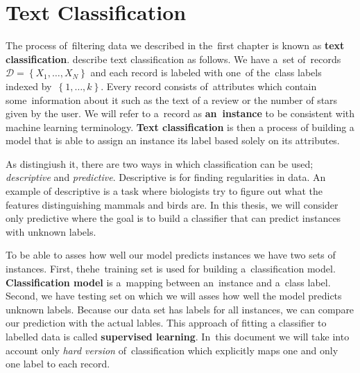 \chapter{Text Classification}


The process of~filtering data we described in the~first chapter is known as {\bf text classification}.
\citet{AggZhai12} describe text classification as follows.
We have a~set of~records~$\mathcal{D} = \left\{X_1, \ldots, X_N\right\}$ and each record is labeled with one~of the~class labels indexed by~$\left\{1,\ldots, k\right\}$.
Every record consists of~attributes which contain some~information about it such as the text of a review or the number of stars given by the user.
We will refer to a~record as {\bf an~instance} to be consistent with machine learning terminology.
{\bf Text classification} is then a process of building a model that is able to assign
an instance its label based solely on its attributes.


As \citet{TanBachKum08} distingiush it, there are two ways in which classification can be used; {\it descriptive} and {\it predictive}.
Descriptive is for finding regularities in data.
An example of descriptive is a task where
biologists try to figure out what the features distinguishing mammals and birds are.
In this thesis, we will consider only predictive where the goal is to build a classifier
that can predict instances with unknown labels.

To be able to asses how well our model predicts instances we have two sets of instances.
First, thehe~training set is  used for building a~classification model.
{\bf Classification model} is a~mapping between an~instance and a~class label.
Second, we have testing set on which we will asses how well the model predicts unknown labels.
Because our data set has labels for all instances, we can compare our prediction with the actual lables.
This approach of fitting a classifier to labelled data is called {\bf supervised learning}.
In~this document we will take into account only \emph{hard version} of~classification which explicitly maps one and only one label to each record.  



